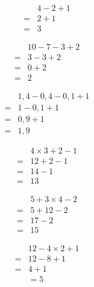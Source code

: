 \begin{multicols}{4}
  \begin{align*}
    &4-2+1\\
    =&2+1\\
    =&3
  \end{align*}
  \vspace{1em}

  \begin{align*}
    &10-7-3+2\\
    =&3-3+2\\
    =&0+2\\
    =&2
  \end{align*}

  \begin{align*}
    &1,4-0,4-0,1+1\\
    =&1-0,1+1\\
    =&0,9+1\\
    =&1,9
  \end{align*}
\end{multicols}

\separe

\begin{multicols}{3}
  \begin{align*}
    &4\times 3+2-1\\
    =&12+2-1\\
    =&14-1\\
    =&13
  \end{align*}

  \begin{align*}
    &5+3\times 4-2\\
    =&5+12-2\\
    =&17-2\\
    =&15
  \end{align*}

  \begin{align*}
    &12-4\times 2+1\\
    =&12-8+1\\
    =&4+1\\
    &=5
  \end{align*}
\end{multicols}

\separe

